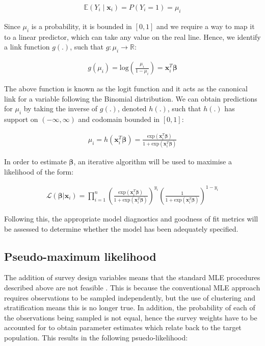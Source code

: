 \begin{align}
\label{eq:logistic-expectation}
\mathbb{E}(Y_{i} \mid \mathbf{x}_{i}) = P(Y_{i} = 1) = \mu_{i}
\end{align}

Since $\mu_{i}$ is a probability, it is bounded in $[0, 1]$ and we require a way to map it to a linear predictor, which can take any value on the real line. Hence, we identify a link function $g(.)$, such that $g: \mu_{i} \rightarrow \mathbb{R}$:

\begin{align}
\label{eq:logistic-link}
g(\mu_{i}) = \text{log} \left( \frac{\mu_{i}}{1 - \mu_{i}} \right) = \mathbf{x}_{i}^{T} \bm{\beta}
\end{align} 

The above function is known as the logit function and it acts as the canonical link for a variable following the Binomial distribution. We can obtain predictions for $\mu_{i}$ by taking the inverse of $g(.)$, denoted $h(.)$, such that $h(.)$ has support on $(-\infty, \infty)$ and codomain bounded in $[0, 1]$:

\begin{align}
\label{eq:logistic-inverse}
\mu_{i} = h(\mathbf{x}_{i}^{T} \bm{\beta}) = \frac{ \text{exp}(\mathbf{x}_{i}^{T} \bm{\beta}) }{ 1 + \text{exp}(\mathbf{x}_{i}^{T} \bm{\beta}) }
\end{align} 

In order to estimate $\bm{\beta}$, an iterative algorithm will be used to maximise a likelihood of the form:

\begin{align}
\label{eq:logistic-likelihood}
\mathcal{L}(\bm{\beta} | \mathbf{x}_{i})		=	\prod_{i = 1}^{n} \left( \frac{ \text{exp}(\mathbf{x}_{i}^{T} \bm{\beta}) }{ 1 + \text{exp}(\mathbf{x}_{i}^{T} \bm{\beta}) } \right) ^ {y_{i}} \left( \frac{ 1 }{ 1 + \text{exp}(\mathbf{x}_{i}^{T} \bm{\beta}) } \right) ^ {1 - y_{i}}
\end{align}

Following this, the appropriate model diagnostics and goodness of fit metrics will be assessed to determine whether the model has been adequately specified.

\subsection{Pseudo-maximum likelihood}

The addition of survey design variables means that the standard MLE procedures described above are not feasible \citep{heeringa2017}. This is because the conventional MLE approach requires observations to be sampled independently, but the use of clustering and stratification means this is no longer true. In addition, the probability of each of the observations being sampled is not equal, hence the survey weights have to be accounted for to obtain parameter estimates which relate back to the target population. This results in the following psuedo-likelihood:

